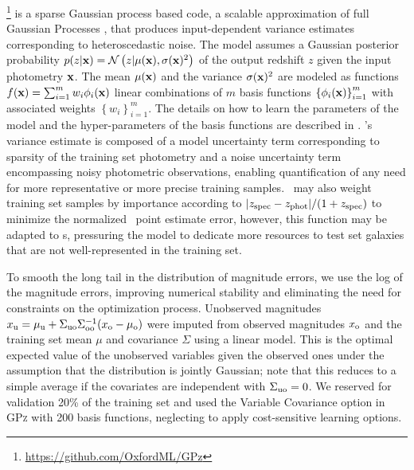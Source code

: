 \gpz \footnote{\url{https://github.com/OxfordML/GPz}} \citep{Almosallam:16a,Almosallam:15b} is a sparse Gaussian process based code, a scalable approximation of full Gaussian Processes \citep{Rasmussen:06}, that produces input-dependent variance estimates corresponding to heteroscedastic noise.
The model assumes a Gaussian posterior probability $p(z \vert {\mathbf{x}}) = \mathcal{N}\left(z \vert \mu({\mathbf{x}}), \sigma({\mathbf{x}})^{2}\right)$ of the output redshift $z$ given the input photometry ${\mathbf{x}}$.
The mean $\mu({\mathbf{x}})$ and the variance $\sigma({\mathbf{x}})^{2}$ are modeled as functions $f({\mathbf{x}}) = \sum_{i=1}^{m}w_{i}\phi_{i}({\mathbf{x}})$ linear combinations of $m$ basis functions $\left\{\phi_{i}({\mathbf{x}})\right\}_{i=1}^{m}$ with associated weights $\left\{w_{i}\right\}_{i=1}^{m}$.
The details on how to learn the parameters of the model and the hyper-parameters of the basis functions are described in \citet{Almosallam:15b}.
\gpz's variance estimate is composed of a model uncertainty term corresponding to sparsity of the training set photometry and a noise uncertainty term encompassing noisy photometric observations, enabling quantification of any need for more representative or more precise training samples.
\gpz\ may also weight training set samples by importance according to $|z_{\rm{spec}} - z_{\rm{phot}}| / (1+z_{\rm{spec}})$ to minimize the normalized \pz\ point estimate error, however, this function may be adapted to \pzpdf s, pressuring the model to dedicate more resources to test set galaxies that are not well-represented in the training set.

To smooth the long tail in the distribution of magnitude errors, we use the log of the magnitude errors, improving numerical stability and eliminating the need for constraints on the optimization process.
Unobserved magnitudes $x_{\rm u} = \mu_{\rm u} + \Sigma_{\rm uo}\Sigma_{\rm oo}^{-1}(x_{\rm o} - \mu_{\rm o})$ were imputed from observed magnitudes $x_{\rm o}$ and the training set mean $\mu$ and covariance $\Sigma$ using a linear model.
This is the optimal expected value of the unobserved variables given the observed ones under the assumption that the distribution is jointly Gaussian; note that this reduces to a simple average if the covariates are independent with $\Sigma_{\rm uo} = 0$.
We reserved for validation 20\% of the training set and used the Variable Covariance option in \textsc{GPz} with 200 basis functions, neglecting to apply cost-sensitive learning options.

